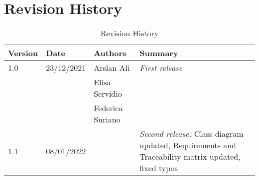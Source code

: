 \newpage
\section{Revision History}
\begin{center}
\setlength\tabcolsep{7pt}
\renewcommand{\arraystretch}{1.5}
\begin{longtable}{|p{1.5cm}|p{1.8cm}|p{2.75cm}|p{5cm}|}
\caption{Revision History}\\
\hline
\endfirsthead
\endhead
\hline
\endlastfoot
\rowcolor{green2}
\textbf{Version} & \textbf{Date} & \textbf{Authors} & \textbf{Summary}\\
\hline
1.0 & 23/12/2021 & Arslan Ali &  \textit{First release}\\
& & Elisa Servidio & \\
& & Federica Suriano &\\
1.1 & 08/01/2022 &  &  \textit{Second release:} Class diagram updated, Requirements and Traceability matrix updated, fixed typos\\
\end{longtable}
\end{center}